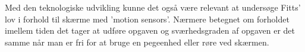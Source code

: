 Med den teknologiske udvikling kunne det også være relevant at undersøge Fitts' lov i forhold til skærme med 'motion sensors'. Nærmere betegnet om forholdet imellem tiden det tager at udføre opgaven og sværhedsgraden af opgaven er det samme når man er fri for at bruge en pegeenhed eller røre ved skærmen.


\nocite{*}

\printbibliography

